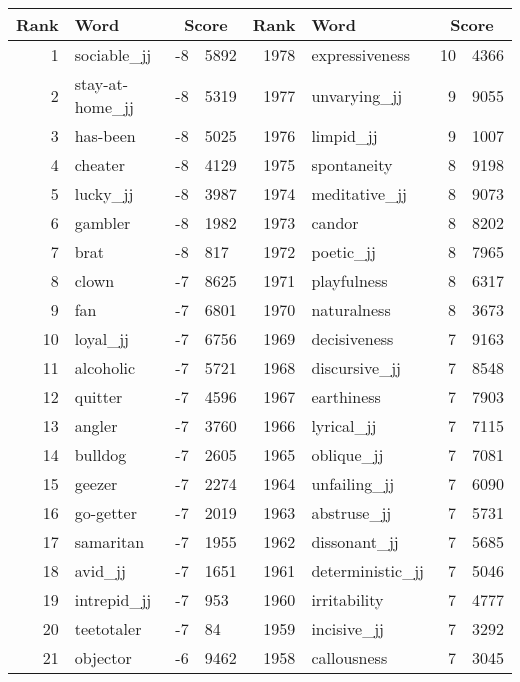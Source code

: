 \begin{table}[tbp]
    \begin{tabular}{| rlr@{.}l | rlr@{.}l |}
    \hline
    \textbf{Rank} & \textbf{Word} & \multicolumn{2}{c|}{\textbf{Score}} & \textbf{Rank} & \textbf{Word} & \multicolumn{2}{c|}{\textbf{Score}} \\
    \hline
    1 & sociable\_jj & -8 & 5892    &    1978 & expressiveness & 10 & 4366 \\
    2 & stay-at-home\_jj & -8 & 5319    &    1977 & unvarying\_jj & 9 & 9055 \\
    3 & has-been & -8 & 5025    &    1976 & limpid\_jj & 9 & 1007 \\
    4 & cheater & -8 & 4129    &    1975 & spontaneity & 8 & 9198 \\
    5 & lucky\_jj & -8 & 3987    &    1974 & meditative\_jj & 8 & 9073 \\
    6 & gambler & -8 & 1982    &    1973 & candor & 8 & 8202 \\
    7 & brat & -8 & 817    &    1972 & poetic\_jj & 8 & 7965 \\
    8 & clown & -7 & 8625    &    1971 & playfulness & 8 & 6317 \\
    9 & fan & -7 & 6801    &    1970 & naturalness & 8 & 3673 \\
    10 & loyal\_jj & -7 & 6756    &    1969 & decisiveness & 7 & 9163 \\
    11 & alcoholic & -7 & 5721    &    1968 & discursive\_jj & 7 & 8548 \\
    12 & quitter & -7 & 4596    &    1967 & earthiness & 7 & 7903 \\
    13 & angler & -7 & 3760    &    1966 & lyrical\_jj & 7 & 7115 \\
    14 & bulldog & -7 & 2605    &    1965 & oblique\_jj & 7 & 7081 \\
    15 & geezer & -7 & 2274    &    1964 & unfailing\_jj & 7 & 6090 \\
    16 & go-getter & -7 & 2019    &    1963 & abstruse\_jj & 7 & 5731 \\
    17 & samaritan & -7 & 1955    &    1962 & dissonant\_jj & 7 & 5685 \\
    18 & avid\_jj & -7 & 1651    &    1961 & deterministic\_jj & 7 & 5046 \\
    19 & intrepid\_jj & -7 & 953    &    1960 & irritability & 7 & 4777 \\
    20 & teetotaler & -7 & 84    &    1959 & incisive\_jj & 7 & 3292 \\
    21 & objector & -6 & 9462    &    1958 & callousness & 7 & 3045 \\

\end{tabular}
\end{table}
